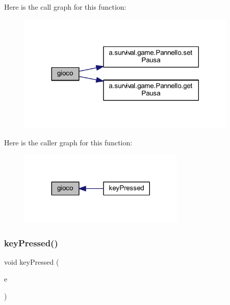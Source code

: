 Here is the call graph for this function\+:
\nopagebreak
\begin{figure}[H]
\begin{center}
\leavevmode
\includegraphics[width=296pt]{classa_1_1survival_1_1game_1_1_tastiera_a8b74f3af7a41bc6d69584817b83a067c_cgraph}
\end{center}
\end{figure}
Here is the caller graph for this function\+:
\nopagebreak
\begin{figure}[H]
\begin{center}
\leavevmode
\includegraphics[width=224pt]{classa_1_1survival_1_1game_1_1_tastiera_a8b74f3af7a41bc6d69584817b83a067c_icgraph}
\end{center}
\end{figure}
\mbox{\label{classa_1_1survival_1_1game_1_1_tastiera_aa12eb1084be2c4d9b03d5f248f00900d}} 
\subsubsection{\texorpdfstring{key\+Pressed()}{keyPressed()}}
{\footnotesize\ttfamily void key\+Pressed (\begin{DoxyParamCaption}\item[{Key\+Event}]{e }\end{DoxyParamCaption})}



